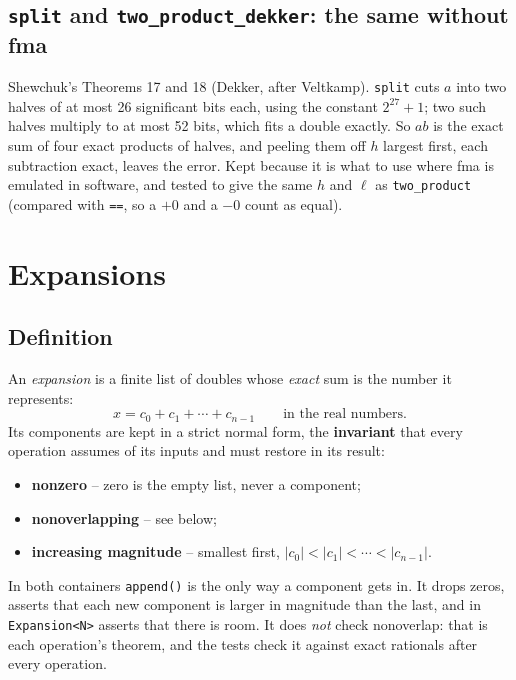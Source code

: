 \documentclass[11pt,a4paper]{article}
\newcommand{\code}[1]{\texttt{#1}}
\theoremstyle{definition}
\theoremstyle{remark}
\begin{document}
\subsection{\texorpdfstring{\code{split}}{split} and \texorpdfstring{\code{two\_product\_dekker}}{two\_product\_dekker}: the same without fma}\label{ssec:split}

Shewchuk's Theorems 17 and 18 (Dekker, after Veltkamp). \code{split} cuts $a$ into two halves of
at most 26 significant bits each, using the constant $2^{27}+1$; two such halves multiply to at
most 52 bits, which fits a double exactly. So $ab$ is the exact sum of four exact products of
halves, and peeling them off $h$ largest first, each subtraction exact, leaves the error. Kept
because it is what to use where fma is emulated in software, and tested to give the same
$h$ and $\ell$ as \code{two\_product} (compared with \code{==}, so a $+0$ and a $-0$ count as
equal).

\section{Expansions}\label{sec:expansions}

\subsection{Definition}

An \emph{expansion} is a finite list of doubles whose \emph{exact} sum is the number it
represents:
\[
  x = c_0 + c_1 + \cdots + c_{n-1} \qquad \text{in the real numbers.}
\]
Its components are kept in a strict normal form, the \textbf{invariant} that every operation
assumes of its inputs and must restore in its result:
\begin{itemize}
  \item \textbf{nonzero} -- zero is the empty list, never a component;
  \item \textbf{nonoverlapping} -- see below;
  \item \textbf{increasing magnitude} -- smallest first, $|c_0| < |c_1| < \cdots < |c_{n-1}|$.
\end{itemize}
In both containers \code{append()} is the only way a component gets in. It drops zeros,
asserts that each new component is larger in magnitude than the last, and in \code{Expansion<N>}
asserts that there is room. It does \emph{not} check nonoverlap: that is each operation's theorem,
and the tests check it against exact rationals after every operation.
\end{document}
